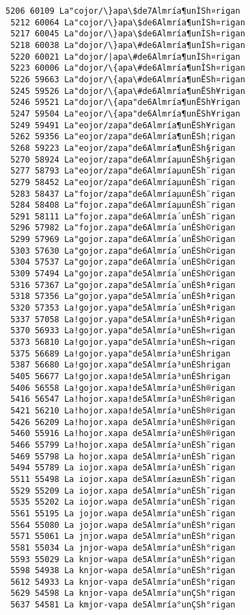 \documentclass[11pt]{article}
\begin{document}
\begin{Verbatim}[commandchars=\\\{\}]
 5206 60109 La"cojor/\}apa\$de7Almría¶unÌSh¤rigan
 5212 60064 La"cojor/\}apa\$de6Almría¶unÌSh¤rigan
 5217 60045 La"dojor/\}apa\$de6Almría¶unÌSh¤rigan
 5218 60038 La"dojor/\}apa\#de6Almría¶unÌSh¤rigan
 5220 60021 La"dojor/|apa\#de6Almría¶unÌSh¤rigan
 5223 60006 La"dojor/\{apa\#de6Almría¶unÌSh¤rigan
 5226 59663 La"dojor/\{apa\#de6Almría¶unËSh¤rigan
 5245 59526 La"dojor/\{apa\#de6Almría¶unËSh¥rigan
 5246 59521 La"dojor/\{apa"de6Almría¶unËSh¥rigan
 5247 59504 La"eojor/\{apa"de6Almría¶unËSh¥rigan
 5249 59491 La"eojor/zapa"de6Almría¶unËSh¥rigan
 5262 59356 La"eojor/zapa"de6Almría¶unËSh¦rigan
 5268 59223 La"eojor/zapa"de6Almría¶unËSh§rigan
 5270 58924 La"eojor/zapa"de6AlmríaµunËSh§rigan
 5277 58793 La"eojor/zapa"de6AlmríaµunËSh¨rigan
 5279 58452 La"eojor/zapa"de6AlmríaµunÊSh¨rigan
 5283 58437 La"fojor/zapa"de6AlmríaµunÊSh¨rigan
 5284 58408 La"fojor.zapa"de6AlmríaµunÊSh¨rigan
 5291 58111 La"fojor.zapa"de6Almría´unÊSh¨rigan
 5296 57982 La"fojor.zapa"de6Almría´unÊSh©rigan
 5299 57969 La"gojor.zapa"de6Almría´unÊSh©rigan
 5303 57630 La"gojor.zapa"de6Almría´unÉSh©rigan
 5304 57537 La"gojor.zapa"de6Almría´unÉSh©rigan
 5309 57494 La"gojor.zapa"de5Almría´unÉSh©rigan
 5316 57367 La"gojor.zapa"de5Almría´unÉShªrigan
 5318 57356 La"gojor.yapa"de5Almría´unÉShªrigan
 5320 57353 La!gojor.yapa"de5Almría´unÉShªrigan
 5337 57058 La!gojor.yapa"de5Almría³unÉShªrigan
 5370 56933 La!gojor.yapa"de5Almría³unÉSh«rigan
 5373 56810 La!gojor.yapa"de5Almría³unÉSh¬rigan
 5375 56689 La!gojor.yapa"de5Almría³unÉSh­rigan
 5387 56680 La!gojor.xapa"de5Almría³unÉSh­rigan
 5405 56677 La!gojor.xapa!de5Almría³unÉSh­rigan
 5406 56558 La!gojor.xapa!de5Almría³unÉSh®rigan
 5416 56547 La!hojor.xapa!de5Almría³unÉSh®rigan
 5421 56210 La!hojor.xapa!de5Almría³unÈSh®rigan
 5426 56209 La!hojor.xapa de5Almría³unÈSh®rigan
 5460 55916 La!hojor.xapa de5Almría²unÈSh®rigan
 5466 55799 La!hojor.xapa de5Almría²unÈSh¯rigan
 5469 55798 La hojor.xapa de5Almría²unÈSh¯rigan
 5494 55789 La iojor.xapa de5Almría²unÈSh¯rigan
 5511 55498 La iojor.xapa de5Almría±unÈSh¯rigan
 5529 55209 La iojor.xapa de5Almría°unÈSh¯rigan
 5535 55202 La iojor.wapa de5Almría°unÈSh¯rigan
 5561 55195 La jojor.wapa de5Almría°unÈSh¯rigan
 5564 55080 La jojor.wapa de5Almría°unÈSh°rigan
 5571 55061 La jnjor.wapa de5Almría°unÈSh°rigan
 5581 55034 La jnjor-wapa de5Almría°unÈSh°rigan
 5593 55029 La knjor-wapa de5Almría°unÈSh°rigan
 5598 54938 La knjor-wapa de5Almría°unÈSh°rigan
 5612 54933 La knjor-vapa de5Almría°unÈSh°rigan
 5629 54598 La knjor-vapa de5Almría°unÇSh°rigan
 5637 54581 La kmjor-vapa de5Almría°unÇSh°rigan

\end{Verbatim}
\end{document}

